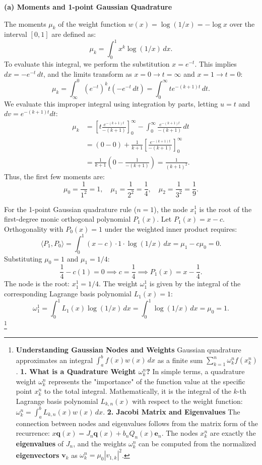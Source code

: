 \begin{solution}
\textbf{(a) Moments and 1-point Gaussian Quadrature}

The moments $\mu_k$ of the weight function $w(x) = \log(1/x) = -\log x$ over the interval $[0, 1]$ are defined as:
\[ \mu_k = \int_0^1 x^k \log(1/x) \, dx. \]
To evaluate this integral, we perform the substitution $x = e^{-t}$. This implies $dx = -e^{-t} \, dt$, and the limits transform as $x=0 \to t=\infty$ and $x=1 \to t=0$:
\[ \mu_k = \int_{\infty}^0 (e^{-t})^k t (-e^{-t} \, dt) = \int_0^\infty t e^{-(k+1)t} \, dt. \]
We evaluate this improper integral using integration by parts, letting $u = t$ and $dv = e^{-(k+1)t} dt$:
\begin{align*}
    \mu_k &= \left[ t \frac{e^{-(k+1)t}}{-(k+1)} \right]_0^\infty - \int_0^\infty \frac{e^{-(k+1)t}}{-(k+1)} \, dt \\
    &= (0 - 0) + \frac{1}{k+1} \left[ \frac{e^{-(k+1)t}}{-(k+1)} \right]_0^\infty \\
    &= \frac{1}{k+1} \left( 0 - \frac{1}{-(k+1)} \right) = \frac{1}{(k+1)^2}.
\end{align*}
Thus, the first few moments are:
\[ \mu_0 = \frac{1}{1^2} = 1, \quad \mu_1 = \frac{1}{2^2} = \frac{1}{4}, \quad \mu_2 = \frac{1}{3^2} = \frac{1}{9}. \]

For the 1-point Gaussian quadrature rule ($n=1$), the node $x_1^1$ is the root of the first-degree monic orthogonal polynomial $P_1(x)$. Let $P_1(x) = x - c$. Orthogonality with $P_0(x) = 1$ under the weighted inner product requires:
\[ \langle P_1, P_0 \rangle = \int_0^1 (x - c) \cdot 1 \cdot \log(1/x) \, dx = \mu_1 - c \mu_0 = 0. \]
Substituting $\mu_0 = 1$ and $\mu_1 = 1/4$:
\[ \frac{1}{4} - c(1) = 0 \implies c = \frac{1}{4} \implies P_1(x) = x - \frac{1}{4}. \]
The node is the root: $\boxed{x_1^1 = 1/4}$. The weight $\omega_1^1$ is given by the integral of the corresponding Lagrange basis polynomial $L_1(x) = 1$:
\[ \omega_1^1 = \int_0^1 L_1(x) \log(1/x) \, dx = \int_0^1 \log(1/x) \, dx = \mu_0 = \boxed{1}. \] \footnote{\textbf{Understanding Gaussian Nodes and Weights} Gaussian quadrature approximates an integral $\int_a^b f(x) w(x) \, dx$ as a finite sum $\sum_{k=1}^n \omega_k^n f(x_k^n)$. \textbf{1. What is a Quadrature Weight $\omega_k^n$?} In simple terms, a quadrature weight $\omega_k^n$ represents the "importance" of the function value at the specific point $x_k^n$ to the total integral. Mathematically, it is the integral of the $k$-th Lagrange basis polynomial $L_{k,n}(x)$ with respect to the weight function: $\omega_k^n = \int_a^b L_{k,n}(x) w(x) \, dx$. \textbf{2. Jacobi Matrix and Eigenvalues} The connection between nodes and eigenvalues follows from the matrix form of the recurrence: $x \mathbf{q}(x) = J_n \mathbf{q}(x) + b_n Q_n(x) \mathbf{e}_n$. The nodes $x_k^n$ are exactly the \textbf{eigenvalues} of $J_n$, and the weights $\omega_k^n$ can be computed from the normalized \textbf{eigenvectors} $\mathbf{v}_k$ as $\omega_k^n = \mu_0 |v_{1,k}|^2$.}


\end{solution}
